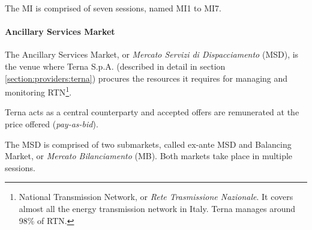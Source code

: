     The MI is comprised of seven sessions, named MI1 to MI7.

\paragraph{Ancillary Services Market}
    The Ancillary Services Market, or \textit{Mercato Servizi di Dispacciamento} (MSD), is the venue where Terna S.p.A. (described in detail in section \ref{section:providers:terna}) procures the resources it requires for managing and monitoring RTN\footnote{National Transmission Network, or \textit{Rete Trasmissione Nazionale}. It covers almost all the energy transmission network in Italy. Terna manages around 98\% of RTN.}.
    
    Terna acts as a central counterparty and accepted offers are remunerated at the price offered (\textit{pay-as-bid}).

    The MSD is comprised of two submarkets, called ex-ante MSD and Balancing Market, or \textit{Mercato Bilanciamento} (MB).
    Both markets take place in multiple sessions.
